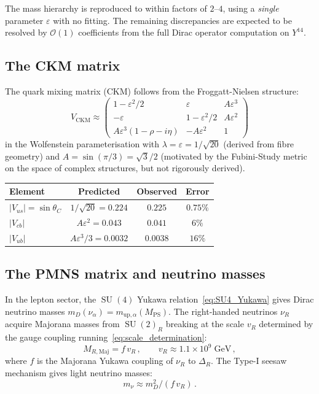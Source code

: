 \documentclass[12pt,a4paper]{article}
\theoremstyle{definition}
\newcommand{\SU}{\operatorname{SU}}
\newcommand{\MPS}{M_{\mathrm{PS}}}
\begin{document}
\noindent
The mass hierarchy is reproduced to within factors of $2$--$4$, using a \emph{single} parameter $\varepsilon$ with no fitting.
The remaining discrepancies are expected to be resolved by $\mathcal{O}(1)$ coefficients from the full Dirac operator computation on $Y^{14}$.

\subsection{The CKM matrix}

The quark mixing matrix (CKM) follows from the Froggatt-Nielsen structure:
\begin{equation}
V_{\mathrm{CKM}} \approx \begin{pmatrix}
1 - \varepsilon^2/2 & \varepsilon & A\varepsilon^3 \\
-\varepsilon & 1 - \varepsilon^2/2 & A\varepsilon^2 \\
A\varepsilon^3(1-\rho-i\eta) & -A\varepsilon^2 & 1
\end{pmatrix}
\end{equation}
in the Wolfenstein parameterisation with $\lambda = \varepsilon = 1/\sqrt{20}$ (derived from fibre geometry) and $A = \sin(\pi/3) = \sqrt{3}/2$ (motivated by the Fubini-Study metric on the space of complex structures, but not rigorously derived).

\begin{center}
\renewcommand{\arraystretch}{1.3}
\begin{tabular}{lccc}
\toprule
\textbf{Element} & \textbf{Predicted} & \textbf{Observed} & \textbf{Error} \\
\midrule
$|V_{us}| = \sin\theta_C$ & $1/\sqrt{20} = 0.224$ & $0.225$ & $0.75\%$ \\
$|V_{cb}|$ & $A\varepsilon^2 = 0.043$ & $0.041$ & $6\%$ \\
$|V_{ub}|$ & $A\varepsilon^3/3 = 0.0032$ & $0.0038$ & $16\%$ \\
\bottomrule
\end{tabular}
\end{center}

\subsection{The PMNS matrix and neutrino masses}

In the lepton sector, the $\SU(4)$ Yukawa relation~\eqref{eq:SU4_Yukawa} gives Dirac neutrino masses $m_D(\nu_\alpha) = m_{\mathrm{up},\alpha}(\MPS)$.
The right-handed neutrinos $\nu_R$ acquire Majorana masses from $\SU(2)_R$ breaking at the scale $v_R$ determined by the gauge coupling running~\eqref{eq:scale_determination}:
\begin{equation}
M_{R,\text{Maj}} = f\, v_R\,,\qquad v_R \approx 1.1 \times 10^{9}\;\mathrm{GeV}\,,
\end{equation}
where $f$ is the Majorana Yukawa coupling of $\nu_R$ to $\Delta_R$.
The Type-I seesaw mechanism gives light neutrino masses:
\begin{equation}
m_\nu \approx m_D^2 / (f\, v_R)\,.
\end{equation}
\end{document}
